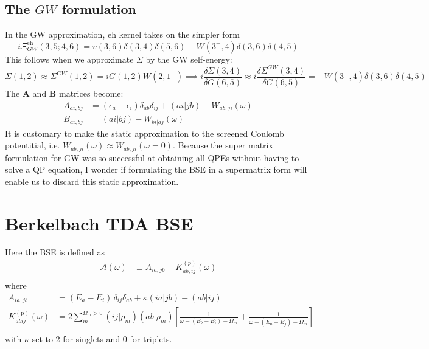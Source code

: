 \subsection{The $G W$ formulation}
In the GW approximation, eh kernel takes on the simpler form
\begin{equation}
    i{\Xi}^{\mathrm{eh}}_{GW}(3,5;4,6) =v(3,6)\delta (3,4)\delta (5,6) -W(3^{+}, 4)\delta (3,6)\delta (4,5) 
\end{equation}
This follows when we approximate $\Sigma $ by the GW self-energy:
\begin{equation}
    \Sigma(1,2)\approx \Sigma^{GW}(1,2) = iG(1,2) W(2,1^+) \implies i\frac{\delta \Sigma\left(3,4\right)}{\delta G\left(6,5\right)} \approx i\frac{\delta \Sigma^{GW}\left(3,4\right)}{\delta G\left(6,5\right)} = -W(3^{+}, 4)\delta (3,6)\delta (4,5)
\end{equation}
The $\bm{A}$ and $\bm{B}$ matrices become:
\begin{align}
A_{ai,bj} &= \left( \epsilon_a - \epsilon_i \right) \delta_{ab} \delta_{ij} + (ai|jb) - W_{ab,ji}(\omega) \\
B_{ai,bj} &= (ai|bj) - W_{bi|aj}(\omega)
\end{align}
It is customary to make the static approximation to the screened Coulomb potentitial, i.e. $W_{ab,ji}(\omega) \approx W_{ab,ji}(\omega =0)$. Because the super matrix formulation for GW was so successful at obtaining all QPEs without having to solve a QP equation, I wonder if formulating the BSE in a supermatrix form will enable us to discard this static approximation.
\section{Berkelbach TDA BSE}
Here the BSE is defined as
\begin{align}
    \mathcal{A}(\omega) & \equiv A_{ia,jb} - K^{(p)}_{ab,ij}(\omega)\\
\end{align}
where
\begin{align}
A_{ia,jb} &= (E_a - E_i)\,\delta_{ij}\delta_{ab} + \kappa (ia|jb) - (ab|ij) \\
K_{abij}^{(\mathrm{p})}(\omega) &= 2 \sum_m^{\Omega_m>0}\left(i j| \rho_m\right)\left(a b|\rho_m\right)\left[\frac{1}{\omega-\left(E_b-E_i\right)-\Omega_m}+\frac{1}{\omega-\left(E_a-E_j\right)-\Omega_m}\right] \\
\end{align}
with $\kappa$ set to 2 for singlets and 0 for triplets.

